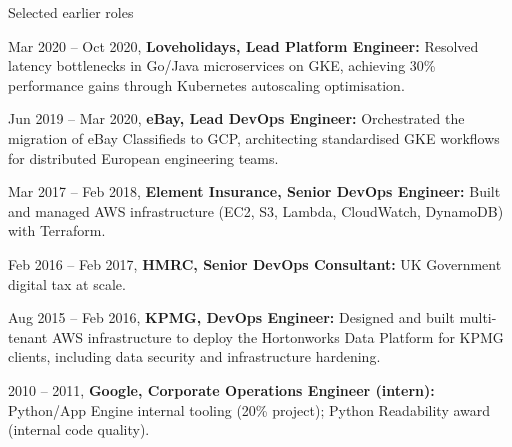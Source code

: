 \begin{cventries}
  \cventry
  {Selected earlier roles}
  {}
  {}
  {}
  {
    \begin{cvitems}
      \item {Mar 2020 -- Oct 2020, \textbf{Loveholidays, Lead Platform Engineer:} Resolved latency bottlenecks in Go/Java microservices on GKE, achieving 30\% performance gains through Kubernetes autoscaling optimisation.}
      \item {Jun 2019 -- Mar 2020, \textbf{eBay, Lead DevOps Engineer:} Orchestrated the migration of eBay Classifieds to GCP, architecting standardised GKE workflows for distributed European engineering teams.}
      \item {Mar 2017 -- Feb 2018, \textbf{Element Insurance, Senior DevOps Engineer:} Built and managed AWS infrastructure (EC2, S3, Lambda, CloudWatch, DynamoDB) with Terraform.}
      \item {Feb 2016 -- Feb 2017, \textbf{HMRC, Senior DevOps Consultant:} UK Government digital tax at scale.}
      \item {Aug 2015 -- Feb 2016, \textbf{KPMG, DevOps Engineer:} Designed and built multi-tenant AWS infrastructure to deploy the Hortonworks Data Platform for KPMG clients, including data security and infrastructure hardening.}
      \item {2010 -- 2011, \textbf{Google, Corporate Operations Engineer (intern):} Python/App Engine internal tooling (20\% project); Python Readability award (internal code quality).}
    \end{cvitems}
  }

\end{cventries}
